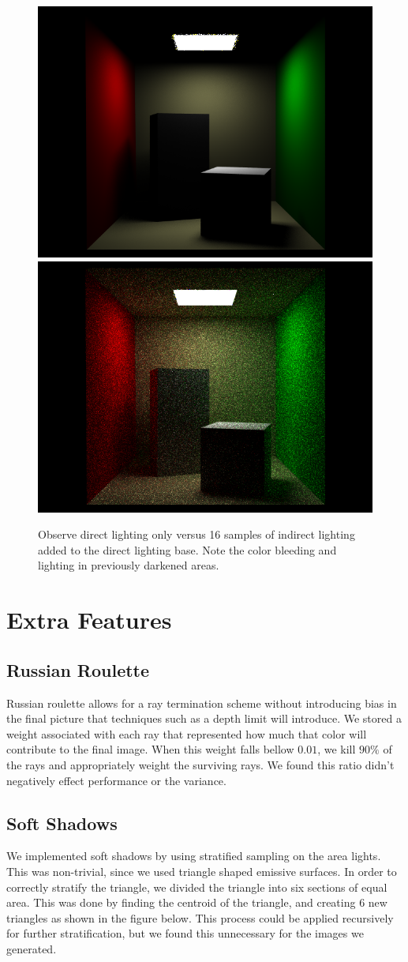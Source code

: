 \documentclass[11pt]{article}
\begin{document}
\begin{figure}
 \begin{center}
	\includegraphics[width=.45\linewidth]{figs/direct_only_cornell}
	\includegraphics[width=.45\linewidth]{figs/everything_1sample}
	\caption{Observe direct lighting only versus 16 samples of indirect lighting added to the direct lighting base. Note the color bleeding and lighting in previously darkened areas.} 
 \end{center}
\end{figure}

\section{Extra Features}

\subsection{Russian Roulette}
Russian roulette allows for a ray termination scheme without introducing bias in the final picture that techniques such as a depth limit will introduce. We stored a weight associated with each ray that represented how much that color will contribute to the final image. When this weight falls bellow $0.01$, we kill $90\%$ of the rays and appropriately weight the surviving rays. We found this ratio didn't negatively effect performance or the variance.

\subsection{Soft Shadows}
We implemented soft shadows by using stratified sampling on the area lights. This was non-trivial, since we used triangle shaped emissive surfaces. In order to correctly stratify the triangle, we divided the triangle into six sections of equal area. This was done by finding the centroid of the triangle, and creating 6 new triangles as shown in the figure below. This process could be applied recursively for further stratification, but we found this unnecessary for the images we generated.
\end{document}
